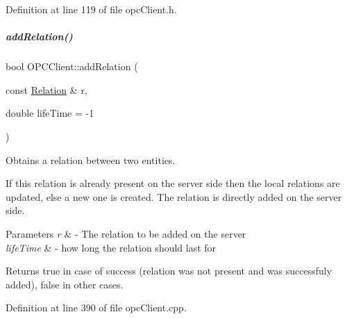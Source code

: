 Definition at line 119 of file opc\+Client.\+h.

\mbox{\label{group__icubclient__clients_a08ede3e77a372824e3a176a1d6466638}} 
\subparagraph{\texorpdfstring{add\+Relation()}{addRelation()}\hspace{0.1cm}{\footnotesize\ttfamily [1/2]}}
{\footnotesize\ttfamily bool O\+P\+C\+Client\+::add\+Relation (\begin{DoxyParamCaption}\item[{const \hyperlink{group__icubclient__representations_classicubclient_1_1Relation}{Relation} \&}]{r,  }\item[{double}]{life\+Time = {\ttfamily -\/1} }\end{DoxyParamCaption})}



Obtains a relation between two entities. 

If this relation is already present on the server side then the local relations are updated, else a new one is created. The relation is directly added on the server side. 
\begin{DoxyParams}{Parameters}
{\em r} & -\/ The relation to be added on the server \\
\hline
{\em life\+Time} & -\/ how long the relation should last for \\
\hline
\end{DoxyParams}
\begin{DoxyReturn}{Returns}
true in case of success (relation was not present and was successfuly added), false in other cases. 
\end{DoxyReturn}


Definition at line 390 of file opc\+Client.\+cpp.

